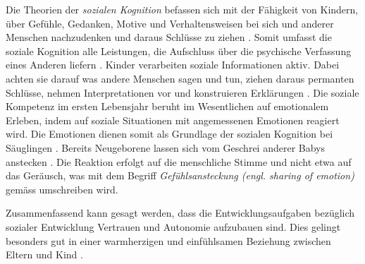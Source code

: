 Die Theorien der \textit{sozialen Kognition} befassen sich mit der Fähigkeit von Kindern, über Gefühle, Gedanken, Motive und Verhaltensweisen bei sich und anderer Menschen nachzudenken und daraus Schlüsse zu ziehen \cite[S.~486ff]{Siegler2008}. Somit umfasst die soziale Kognition alle Leistungen, die Aufschluss über die psychische Verfassung eines Anderen liefern \cite[S.~237ff]{Bischof2011}. Kinder verarbeiten soziale Informationen aktiv. Dabei achten sie darauf was andere Menschen sagen und tun, ziehen daraus permanten Schlüsse, nehmen Interpretationen vor und konstruieren Erklärungen \cite{Siegler2008}. Die soziale Kompetenz im ersten Lebensjahr beruht im Wesentlichen auf emotionalem Erleben, indem auf soziale Situationen mit angemessenen Emotionen reagiert wird. Die Emotionen dienen somit als Grundlage der sozialen Kognition bei Säuglingen \cite{Bischof2011}. Bereits Neugeborene lassen sich vom Geschrei anderer Babys anstecken \cite{Simner1971}. Die Reaktion erfolgt auf die menschliche Stimme und nicht etwa auf das Geräusch, was mit dem Begriff \textit{Gefühlsansteckung (engl. sharing of emotion)} gemäss  umschreiben wird.

Zusammenfassend kann gesagt werden, dass die Entwicklungsaufgaben bezüglich sozialer Entwicklung Vertrauen und Autonomie aufzubauen sind. Dies gelingt besonders gut in einer warmherzigen und einfühlsamen Beziehung zwischen Eltern und Kind \cite[S.~224]{Berk2011}.

